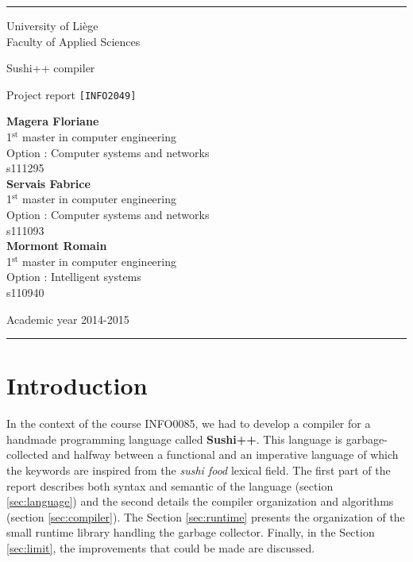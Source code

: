 \documentclass[a4paper,11pt]{article}
\begin{document}
\thispagestyle{empty}
\rule{1\linewidth}{1px}
{ \sc
\begin{center}
{\small University of Liège}\\
{\small Faculty of Applied Sciences}

\end{center}

\vfill
\begin{center}

{\Huge Sushi++ compiler\\}
\end{center}
\begin{center}
{\Huge Project report  {\LARGE \tt [INFO2049]} }
\end{center}
\begin{center}
\textbf{Magera Floriane}\\
{\small 1$^{\text{st}}$ master in computer engineering}\\
{\small Option : Computer systems and networks}\\
{\small s111295} \\ 
\textbf{Servais Fabrice}\\
{\small 1$^{\text{st}}$ master in computer engineering}\\
{\small Option : Computer systems and networks}\\
{\small s111093} \\
\textbf{Mormont Romain}\\
{\small 1$^{\text{st}}$ master in computer engineering}\\
{\small Option : Intelligent systems}\\
{\small s110940} \\
\end{center}

\vfill
\begin{center}
Academic year 2014-2015\\
\end{center}
}
\rule{1\linewidth}{1px}
\newpage
\thispagestyle{empty}
\tableofcontents
\newpage
\setcounter{page}{1}
\section{Introduction}
In the context of the course INFO0085, we had to develop a compiler for a handmade programming language called \textbf{Sushi++}. This language is garbage-collected and halfway between a functional and an imperative language of which the keywords are inspired from the \textit{sushi food} lexical field. The first part of the report describes both syntax and semantic of the language (section \ref{sec:language}) and the second details the compiler organization and algorithms (section \ref{sec:compiler}). The Section \ref{sec:runtime} presents the organization of the small runtime library handling the garbage collector. Finally, in the Section \ref{sec:limit}, the improvements that could be made are discussed.
\end{document}
